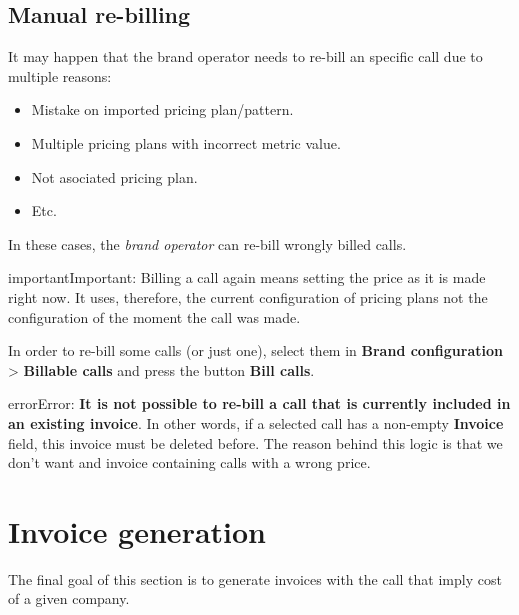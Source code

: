 \documentclass[letterpaper,10pt,english]{sphinxmanual}
\begin{document}
\subsection{Manual re-billing}
\label{billing_and_invoices/bill_a_call:manual-re-billing}
It may happen that the brand operator needs to re-bill an specific call due to
multiple reasons:
\begin{itemize}
\item {} 
Mistake on imported pricing plan/pattern.

\item {} 
Multiple pricing plans with incorrect metric value.

\item {} 
Not asociated pricing plan.

\item {} 
Etc.

\end{itemize}

In these cases, the \emph{brand operator} can re-bill wrongly billed calls.

\begin{notice}{important}{Important:}
Billing a call again means setting the price as it is made right
now. It uses, therefore, the current configuration of pricing plans
not the configuration of the moment the call was made.
\end{notice}

In order to re-bill some calls (or just one), select them in \textbf{Brand configuration}
\textgreater{} \textbf{Billable calls} and press the button \textbf{Bill calls}.

\noindent{}

\begin{notice}{error}{Error:}
\textbf{It is not possible to re-bill a call that is currently included in
an existing invoice}. In other words, if a selected call has a non-empty
\textbf{Invoice} field, this invoice must be deleted before. The reason behind this
logic is that we don't want and invoice containing calls with a wrong price.
\end{notice}


\section{Invoice generation}
\label{billing_and_invoices/invoices:invoices}\label{billing_and_invoices/invoices::doc}\label{billing_and_invoices/invoices:invoice-generation}
The final goal of this section is to generate invoices with the call that imply
cost of a given company.
\end{document}
